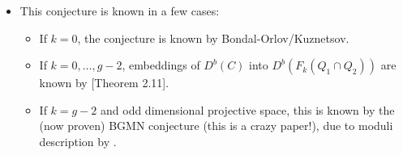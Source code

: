 \documentclass[12pt]{article}
\begin{document}
\begin{itemize}
\begin{itemize}
        \item $\mu_{\mathrm{Hoch}}$ sends a dg category to its Hochschild homology polynomial $\sum \dim_k HH_i t^i$ (can have negative degrees).
        \item The Hochschild-Kostant-Rosenberg decomposition
        \[HH_i(X) \cong \bigoplus_{q-p=i} H^p(X,\Omega_X^q)\]
        implies the diagram commutes, where we map (I think??)
        \begin{align*}
            \Z[x,y] &\longmapsto \Z[t,t^{-1}]\\
            q &\longmapsto t\\
            p &\longmapsto t^{-1}
        \end{align*}
    \end{itemize}
    \item This conjecture is known in a few cases:
    \begin{itemize}
        \item If $k=0$, the conjecture is known by Bondal-Orlov/Kuznetsov.
        \item If $k=0,\dots,g-2$, embeddings of $D^b(C)$ into $D^b(F_k(Q_1\cap Q_2))$ are known by \cite{Fonarev_Kuznetsov_2018}[Theorem 2.11].
        \item If $k=g-2$ and odd dimensional projective space, this is known by the (now proven) BGMN conjecture \cite{Tevelev_Torres_2023,Tevelev_2023} (this is a crazy paper!), due to moduli description by \cite{Desale_Ramanan_1976}.
    \end{itemize}
\end{itemize}

\cite{Belmans_Krug_2024} 
\end{document}
